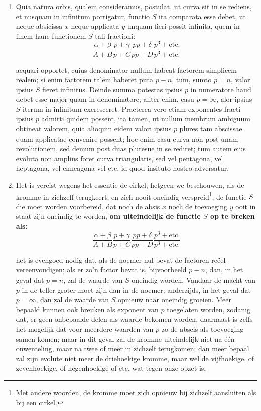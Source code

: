 \documentclass[10pt,a4paper]{article}
\newcommand{\switchenum}{\setcounter{enumi}{\arabic{enumi}-1}\switchcolumn}
\begin{document}
\begin{paracol}{2}
\begin{enumerate}[topsep=1px]
		\switchcolumn*
		
		\item Quia natura orbis, qualem consideramus, postulat, ut curva sit in se rediens, et nusquam in infinitum porrigatur, functio $S$ ita comparata esse debet, ut neque absicissa $x$ neque applicata $y$ unquam fieri possit infinita, quem in finem hanc functionem $S$ tali fractioni:
		\[
			\frac{\alpha+\beta}{A+B}\frac{p+\gamma }{p+C} \frac{p p+\delta}{p p+D} \frac{p^3+\text{etc}.}{p^3+\text{etc}.}
		\]
		\par aequari opportet, cuius denominator nullum habeat factorem simplicem realem; si enim factorem talem haberet puta $p-n$, tum, sumto $p=n$, valor ipsius $S$ fieret infinitus. Deinde summa potestas ipsius $p$ in numeratore haud debet esse major quam in denominatore; aliter enim, casu $p=\infty$, alor ipsius $S$ iterum in infinitum excresceret. Praeterea vero etiam exponentes fracti ipsius $p$ admitti quidem possent, ita tamen, ut nullum membrum ambiguum obtineat valorem, quia alioquin eidem valori ipsius $p$ plures tam abscissae quam applicatae convenire possent; hoc enim casu curva non post unam revolutionem, sed demum post duas pluresue in se rediret; tum autem eius evoluta non amplius foret curva triangularis, sed vel pentagona, vel heptagona, vel enneagona vel etc. id quod insituto nostro adversatur.
		
		\switchenum
		\item Het is vereist wegens het essentie de cirkel, hetgeen we beschouwen, als de kromme in zichzelf terugkeert, en zich nooit oneindig verspreid\footnote{Met andere woorden, de kromme moet zich opnieuw bij zichzelf aansluiten als bij een cirkel.}, de functie $S$ die moet worden voorbereid, dat noch de absis $x$ noch de toevoeging $y$ ooit in staat zijn oneindig te worden, \textbf{om uiteindelijk de functie $S$ op te breken als:}
		\[
			\frac{\alpha+\beta}{A+B}\frac{p+\gamma }{p+C} \frac{p p+\delta}{p p+D} \frac{p^3+\text{etc}.}{p^3+\text{etc}.}
		\]
		\par het is evengoed nodig dat, als de noemer nul bevat de factoren reëel vereenvoudigen; als er zo'n factor bevat is, bijvoorbeeld $p-n$, dan, in het geval dat $p=n$, zal de waarde van $S$ oneindig worden. Vandaar de macht van $p$ in de teller groter moet zijn dan in de noemer; anderzijds, in het geval dat $p=\infty$, dan zal de waarde van $S$ opnieuw naar oneindig groeien. Meer bepaald kunnen ook breuken als exponent van $p$ toegelaten worden, zodanig dat, er geen onbepaalde delen als waarde bekomen worden, daarnaast is zelfs het mogelijk dat voor meerdere waarden van $p$ zo de abscis als toevoeging samen komen; maar in dit geval zal de kromme uiteindelijk niet na één onwenteling, maar na twee of meer in zichzelf terugkomen;  dan meer bepaal zal zijn evolute niet meer de driehoekige kromme, maar wel de vijfhoekige, of zevenhoekige, of negenhoekige of etc. wat tegen onze opzet is.
		


\end{enumerate}
\end{paracol}
\end{document}

